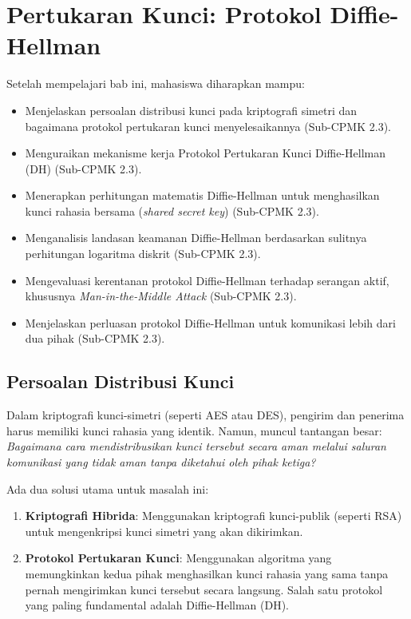 \documentclass[../main.tex]{subfiles}
\begin{document}
\chapter{Pertukaran Kunci: Protokol Diffie-Hellman}

\begin{learningoutcome}
Setelah mempelajari bab ini, mahasiswa diharapkan mampu:
\begin{itemize}
    \item Menjelaskan persoalan distribusi kunci pada kriptografi simetri dan bagaimana protokol pertukaran kunci menyelesaikannya (Sub-CPMK 2.3).
    \item Menguraikan mekanisme kerja Protokol Pertukaran Kunci Diffie-Hellman (DH) (Sub-CPMK 2.3).
    \item Menerapkan perhitungan matematis Diffie-Hellman untuk menghasilkan kunci rahasia bersama (\textit{shared secret key}) (Sub-CPMK 2.3).
    \item Menganalisis landasan keamanan Diffie-Hellman berdasarkan sulitnya perhitungan logaritma diskrit (Sub-CPMK 2.3).
    \item Mengevaluasi kerentanan protokol Diffie-Hellman terhadap serangan aktif, khususnya \textit{Man-in-the-Middle Attack} (Sub-CPMK 2.3).
    \item Menjelaskan perluasan protokol Diffie-Hellman untuk komunikasi lebih dari dua pihak (Sub-CPMK 2.3).
\end{itemize}
\end{learningoutcome}

\section{Persoalan Distribusi Kunci}
Dalam kriptografi kunci-simetri (seperti AES atau DES), pengirim dan penerima harus memiliki kunci rahasia yang identik. Namun, muncul tantangan besar: \textit{Bagaimana cara mendistribusikan kunci tersebut secara aman melalui saluran komunikasi yang tidak aman tanpa diketahui oleh pihak ketiga?}

Ada dua solusi utama untuk masalah ini:
\begin{enumerate}
    \item \textbf{Kriptografi Hibrida}: Menggunakan kriptografi kunci-publik (seperti RSA) untuk mengenkripsi kunci simetri yang akan dikirimkan.
    \item \textbf{Protokol Pertukaran Kunci}: Menggunakan algoritma yang memungkinkan kedua pihak menghasilkan kunci rahasia yang sama tanpa pernah mengirimkan kunci tersebut secara langsung. Salah satu protokol yang paling fundamental adalah Diffie-Hellman (DH).
\end{enumerate}
\end{document}
